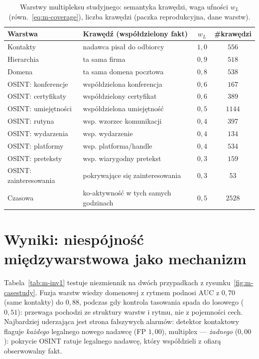 \begin{table}[htbp]\centering\small
\begin{tabular}{llcc}
\toprule
Warstwa & Krawędź (współdzielony fakt) & $w_L$ & \#krawędzi \\
\midrule
Kontakty       & nadawca pisał do odbiorcy        & $1{,}0$ & $556$ \\
Hierarchia     & ta sama firma                    & $0{,}9$ & $518$ \\
Domena         & ta sama domena pocztowa          & $0{,}8$ & $538$ \\
OSINT: konferencje & współdzielona konferencja    & $0{,}6$ & $167$ \\
OSINT: certyfikaty & współdzielony certyfikat     & $0{,}6$ & $389$ \\
OSINT: umiejętności & współdzielona umiejętność   & $0{,}5$ & $1144$ \\
OSINT: rutyna  & wsp. wzorzec komunikacji         & $0{,}4$ & $397$ \\
OSINT: wydarzenia & wsp. wydarzenie                & $0{,}4$ & $134$ \\
OSINT: platformy & wsp. platforma/handle           & $0{,}4$ & $534$ \\
OSINT: preteksty & wsp. wiarygodny pretekst        & $0{,}3$ & $159$ \\
OSINT: zainteresowania & pokrywające się zainteresowania & $0{,}3$ & $53$ \\
Czasowa        & ko-aktywność w tych samych godzinach & $0{,}5$ & $2528$ \\
\bottomrule
\end{tabular}
\caption{Warstwy multipleksu studyjnego: semantyka krawędzi, waga
ufności $w_L$ (równ.~\eqref{eq:m-coverage}), liczba krawędzi
(paczka reprodukcyjna, dane warstw).}
\label{tab:m-warstwy}
\end{table}

\section{Wyniki: niespójność międzywarstwowa jako mechanizm}
\label{sec:m-mechanizm}

Tabela~\ref{tab:m-inv1} testuje niezmiennik na dwóch przypadkach
z rysunku~\ref{fig:m-casestudy}. Fuzja warstw wiedzy domenowej
z rytmem podnosi AUC z $0{,}70$ (same kontakty) do $0{,}88$, podczas
gdy kontrola tasowania spada do losowego ($0{,}51$): przewaga
pochodzi ze struktury warstw i rytmu, nie z pojemności cech.
Najbardziej uderzająca jest strona fałszywych alarmów: detektor
kontaktowy flaguje \emph{każdego} legalnego nowego nadawcę
(FP $1{,}00$), multiplex --- \emph{żadnego} ($0{,}00$): pokrycie
OSINT ratuje legalnego nadawcę, który współdzieli z ofiarą
obserwowalny fakt.

